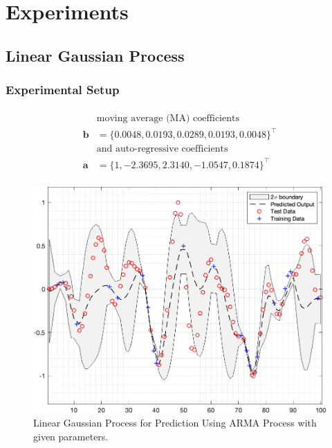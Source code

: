 \documentclass[journal]{IEEEtran}
\begin{document}
\section{Experiments}

\subsection{Linear Gaussian Process}
\subsubsection{Experimental Setup}
\paragraph{}
\begin{align*}
    &\text{moving average (MA) coefficients}\\
    \mathbf{b} &= \{0.0048, 0.0193, 0.0289, 0.0193, 0.0048\}^ \top\\
    &\text{and auto-regressive coefficients}\\
    \mathbf{a} &= \{1, -2.3695, 2.3140, -1.0547, 0.1874\}^ \top
\end{align*}
\paragraph{}

\begin{figure}[ht!]
    \centering
    \includegraphics[width=\linewidth]{figure02.png}
    \caption{Linear Gaussian Process for Prediction Using ARMA Process with given parameters.}
    \label{fig:fig02}
\end{figure}
\end{document}
